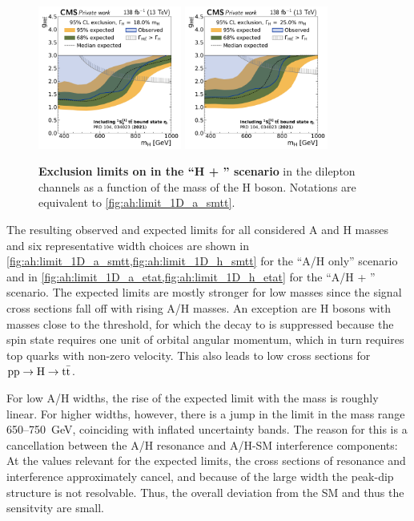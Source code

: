 \begin{figure}[!ph]
    \\
    \includegraphics[width=0.42\textwidth]{figures/ah/limits_etat_w2p8/H_limit_w18p0_g-scan.pdf}%
    \hspace*{0.05\textwidth}%
    \includegraphics[width=0.42\textwidth]{figures/ah/limits_etat_w2p8/H_limit_w25p0_g-scan.pdf}
    \caption{%
        \textbf{Exclusion limits on \gHtt in the ``H + \etat'' scenario} in the dilepton channels as a function of the mass of the H boson. Notations are equivalent to \cref{fig:ah:limit_1D_a_smtt}.
    }
    \label{fig:ah:limit_1D_h_etat}
\end{figure}

The resulting observed and expected limits for all considered A and H masses and six representative width choices are shown in \cref{fig:ah:limit_1D_a_smtt,fig:ah:limit_1D_h_smtt} for the ``A/H only'' scenario and in \cref{fig:ah:limit_1D_a_etat,fig:ah:limit_1D_h_etat} for the ``A/H + \etat'' scenario.
The expected limits are mostly stronger for low masses since the signal cross sections fall off with rising A/H masses. An exception are H bosons with masses close to the threshold, for which the decay to \ttbar is suppressed because the  spin state requires one unit of orbital angular momentum, which in turn requires top quarks with non-zero velocity. This also leads to low cross sections for $\mathrm{pp \rightarrow H \rightarrow \mathrm{t \bar{t}}}$.

For low A/H widths, the rise of the expected limit with the mass is roughly linear. For higher widths, however, there is a jump in the limit in the mass range 650--\SI{750}{\GeV}, coinciding with inflated uncertainty bands. The reason for this is a cancellation between the A/H resonance and A/H-SM interference components: At the \gAHtt values relevant for the expected limits, the cross sections of resonance and interference approximately cancel, and because of the large width the peak-dip structure is not resolvable. Thus, the overall deviation from the SM and thus the sensitvity are small. 

